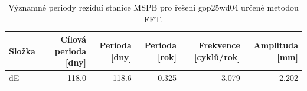 \begin{table}[htbp]
\caption{Významné periody reziduí stanice MSPB pro řešení gop25wd04 určené metodou FFT.}
\label{tab:gop25wd04_stcd_mspb_detr_weighted_1seg_spectral_fft_significant_periods}
\begin{tabular}{lrrrrr}
\toprule
Složka & Cílová perioda [dny] & Perioda [dny] & Perioda [rok] & Frekvence [cyklů/rok] & Amplituda [mm] \\
\midrule
dE & 118.0 & 118.6 & 0.325 & 3.079 & 2.202 \\
\bottomrule
\end{tabular}
\end{table}
